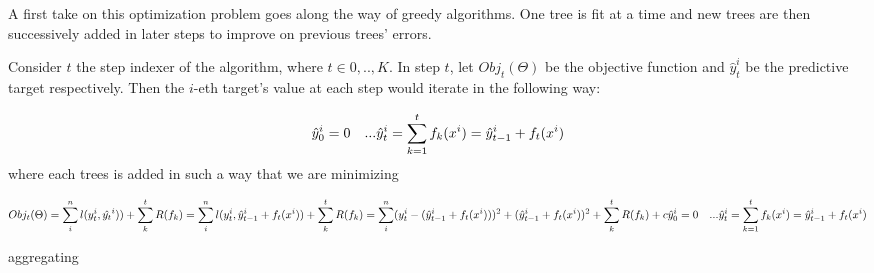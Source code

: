 A first take on this optimization problem goes along the way of greedy algorithms. One tree is fit at a time and new trees are then successively added in later steps to improve on previous trees' errors.

Consider $t$ the step indexer of the algorithm, where $t \in {0,..,K}$. In step $t$, let $Obj_t(\Theta)$ be the objective function and $\hat{y}_t^i$ be the predictive target respectively. Then the $i$-eth target's value at each step would iterate in the following way:

\begin{equation} \label{eq:gb-targetSteps}
\hat{y}_0^i = 0 \\
 \ \ \ ... \\ 
 \hat{y}_t^i = \sum_{k=1}^{t} f_k(x^i) = \hat{y}_{t-1}^i +  f_t(x^i)

\end{equation}
where each trees is added in such a way that we are minimizing

\begin{equation} \label{eq:gb-objSteps}
Obj_t(\Theta) = \sum_i^n l(y_t^i,\hat{y_t}^i)) +   \sum_k^t R(f_k) \\
= \sum_i^n l(y_t^i,\hat{y}_{t-1}^i +  f_t(x^i) ) +   \sum_k^t R(f_k)
= \sum_i^n (y_t^i -(\hat{y}_{t-1}^i +  f_t(x^i)) )^2 + (\hat{y}_{t-1}^i +  f_t(x^i))^2 +   \sum_k^t R(f_k) + c


\hat{y}_0^i = 0 \\
 \ \ \ ... \\ 
 \hat{y}_t^i = \sum_{k=1}^{t} f_k(x^i) = \hat{y}_{t-1}^i +  f_t(x^i)

\end{equation}

aggregating 








